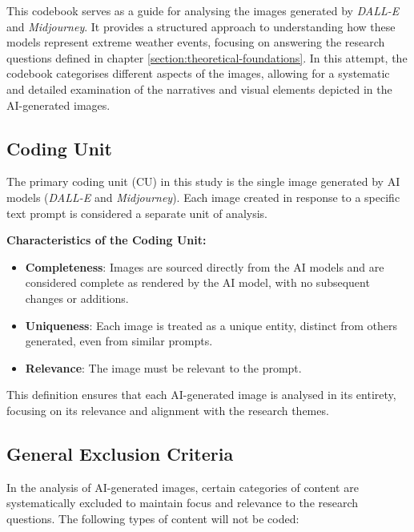 This codebook serves as a guide for analysing the images generated by \textit{DALL-E} and \textit{Midjourney}. It provides a structured approach to understanding how these models represent extreme weather events, focusing on answering the research questions defined in chapter \ref{section:theoretical-foundations}. In this attempt, the codebook categorises different aspects of the images, allowing for a systematic and detailed examination of the narratives and visual elements depicted in the AI-generated images.

\subsection{Coding Unit}
The primary coding unit (CU) in this study is the single image generated by AI models (\textit{DALL-E} and \textit{Midjourney}). Each image created in response to a specific text prompt is considered a separate unit of analysis.


\textbf{Characteristics of the Coding Unit:
}
\begin{itemize}
    \item \textbf{Completeness}: Images are sourced directly from the AI models and are considered complete as rendered by the AI model, with no subsequent changes or additions.
    \item \textbf{Uniqueness}: Each image is treated as a unique entity, distinct from others generated, even from similar prompts.
    \item \textbf{Relevance}: The image must be relevant to the prompt.
\end{itemize}

This definition ensures that each AI-generated image is analysed in its entirety, focusing on its relevance and alignment with the research themes.

\subsection{General Exclusion Criteria}
In the analysis of AI-generated images, certain categories of content are systematically excluded to maintain focus and relevance to the research questions. The following types of content will not be coded:

